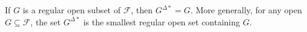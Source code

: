 If $G$ is a regular open subset of $\mathcal{F}$, then $G^{\Delta*} = G$. More generally, for any open $G \subseteq \mathcal{F}$, the set $G^{\Delta*}$ is the smallest regular open set containing $G$.

